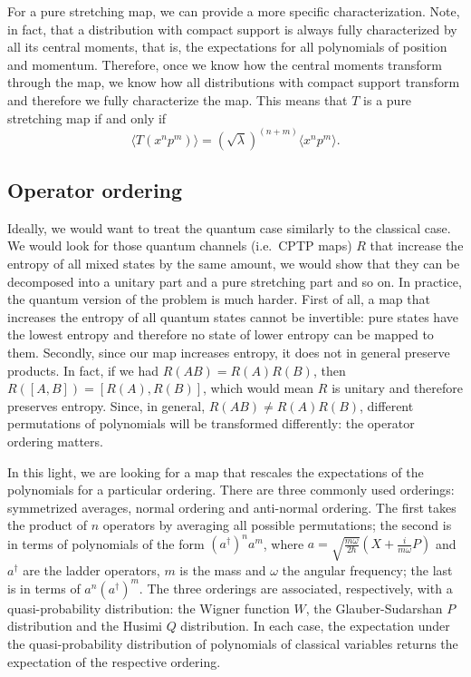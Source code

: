 \documentclass{article}
\begin{document}
For a pure stretching map, we can provide a more specific characterization. Note, in fact, that a distribution with compact support is always fully characterized by all its central moments, that is, the expectations for all polynomials of position and momentum. Therefore, once we know how the central moments transform through the map, we know how all distributions with compact support transform and therefore we fully characterize the map. This means that $T$ is a pure stretching map if and only if
\begin{equation}
    \langle T(x^np^m) \rangle = (\sqrt{\lambda})^{(n+m)} \langle x^n p^m \rangle.
\end{equation}

\subsection{Operator ordering}

Ideally, we would want to treat the quantum case similarly to the classical case. We would look for those quantum channels (i.e.~CPTP maps) $R$ that increase the entropy of all mixed states by the same amount, we would show that they can be decomposed into a unitary part and a pure stretching part and so on. In practice, the quantum version of the problem is much harder. First of all, a map that increases the entropy of all quantum states cannot be invertible: pure states have the lowest entropy and therefore no state of lower entropy can be mapped to them. Secondly, since our map increases entropy, it does not in general preserve products. In fact, if we had $R(AB) = R(A)R(B)$, then $R([A,B]) = [R(A),R(B)]$, which would mean $R$ is unitary and therefore preserves entropy. Since, in general, $R(AB) \neq R(A)R(B)$, different permutations of polynomials will be transformed differently: the operator ordering matters.

In this light, we are looking for a map that rescales the expectations of the polynomials for a particular ordering. There are three commonly used orderings: symmetrized averages, normal ordering and anti-normal ordering. The first takes the product of $n$ operators by averaging all possible permutations; the second is in terms of polynomials of the form $(a^\dagger)^n a^m$, where $a=\sqrt{\frac{m\omega}{2\hbar}}(X+\frac{i}{m\omega}P)$ and $a^\dagger$ are the ladder operators, $m$ is the mass and $\omega$ the angular frequency; the last is in terms of $a^n (a^\dagger)^m$. The three orderings are associated, respectively, with a quasi-probability distribution:\cite{carmichael2013statistical} the Wigner function $W$, the Glauber-Sudarshan $P$ distribution and the Husimi $Q$ distribution. In each case, the expectation under the quasi-probability distribution of polynomials of classical variables returns the expectation of the respective ordering.
\end{document}

